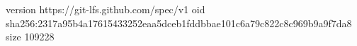 version https://git-lfs.github.com/spec/v1
oid sha256:2317a95b4a17615433252eaa5dceb1fddbbae101c6a79c822c8c969b9a9f7da8
size 109228

